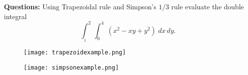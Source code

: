 \documentclass[aima203_lecturenotes_ku.tex]{subfiles}
\begin{document}
\textbf{Questions:} Using Trapezoidal rule and Simpson's $1/3$ rule evaluate the double integral $$\int_{_2}^2 \, \int_0^4 \; (x^2 -xy + y^2) \; dx\, dy.$$
\newpage

\begin{figure}[h]
  \centering
\texttt{[image: trapezoidexample.png]}
\end{figure}

\begin{figure}[h]
  \centering
\texttt{[image: simpsonexample.png]}
\end{figure}
\end{document}
